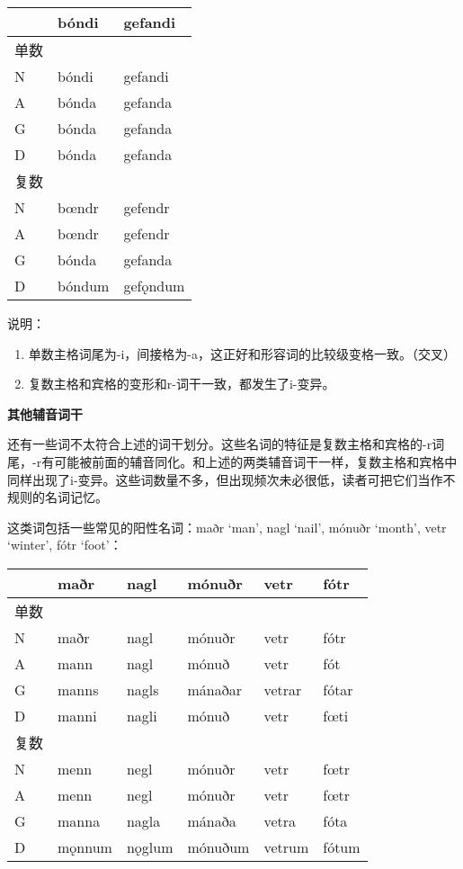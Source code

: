 \begin{longtable}{lll}
\toprule
 & bóndi & gefandi \\
\midrule
\endhead
\bottomrule
\endfoot
单数 & & \\
N & bóndi & gefandi \\
A & bónda & gefanda \\
G & bónda & gefanda \\
D & bónda & gefanda \\
复数 & & \\
N & bœndr & gefendr \\
A & bœndr & gefendr \\
G & bónda & gefanda \\
D & bóndum & gefǫndum \\
\end{longtable}

说明：

\begin{enumerate}
\def\labelenumi{\arabic{enumi})}
\item
  单数主格词尾为-i，间接格为-a，这正好和形容词的比较级变格一致。（交叉）
\item
  复数主格和宾格的变形和r-词干一致，都发生了i-变异。
\end{enumerate}

\textbf{其他辅音词干}

还有一些词不太符合上述的词干划分。这些名词的特征是复数主格和宾格的-r词尾，-r有可能被前面的辅音同化。和上述的两类辅音词干一样，复数主格和宾格中同样出现了i-变异。这些词数量不多，但出现频次未必很低，读者可把它们当作不规则的名词记忆。

这类词包括一些常见的阳性名词：maðr `man', nagl `nail', mónuðr `month',
vetr `winter', fótr `foot'：

\begin{longtable}{llllll}
\toprule
 & maðr & nagl & mónuðr & vetr & fótr \\
\midrule
\endhead
\bottomrule
\endfoot
单数 & & & & & \\
N & maðr & nagl & mónuðr & vetr & fótr \\
A & mann & nagl & mónuð & vetr & fót \\
G & manns & nagls & mánaðar & vetrar & fótar \\
D & manni & nagli & mónuð & vetr & fœti \\
复数 & & & & & \\
N & menn & negl & mónuðr & vetr & fœtr \\
A & menn & negl & mónuðr & vetr & fœtr \\
G & manna & nagla & mánaða & vetra & fóta \\
D & mǫnnum & nǫglum & mónuðum & vetrum & fótum \\
\end{longtable}

